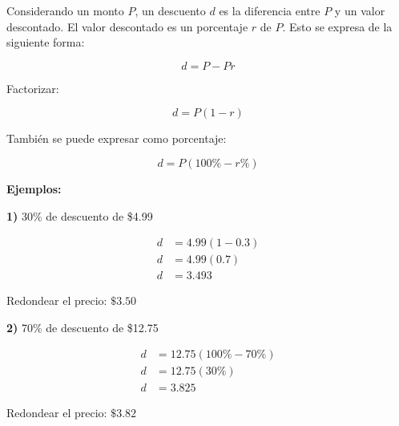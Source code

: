 Considerando un monto $P$, un descuento $d$ es la diferencia entre $P$ y un valor descontado. El valor descontado es un porcentaje $r$ de $P$. Esto se expresa de la siguiente forma:

\[
  d = P - Pr
\]

Factorizar:

\[\boxed{
  d = P\left(1 - r\right)
}\]

También se puede expresar como porcentaje:

\[
  d = P\left(100\% - r\%\right)
\]

\textbf{Ejemplos:}

\textbf{1)} 30\% de descuento de \$4.99

\begin{align*}
  d &= 4.99\left(1 - 0.3\right) \\
  d &= 4.99\left(0.7\right) \\
  d &= 3.493
\end{align*}

Redondear el precio: $\$3.50$

\textbf{2)} 70\% de descuento de \$12.75

\begin{align*}
  d &= 12.75\left(100\% - 70\%\right) \\
  d &= 12.75\left(30\%\right) \\
  d &= 3.825
\end{align*}

Redondear el precio: $\$3.82$

